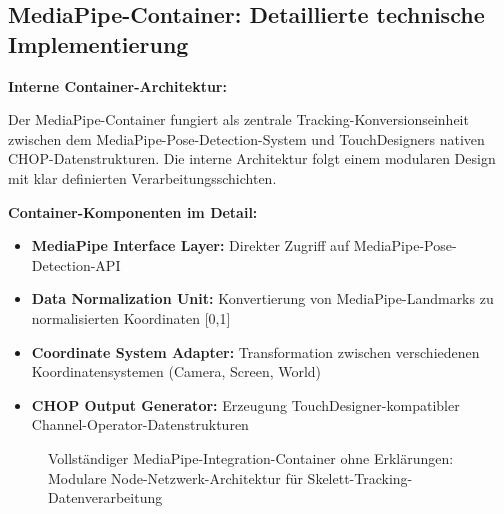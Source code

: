 \subsection{MediaPipe-Container: Detaillierte technische Implementierung}

\textbf{Interne Container-Architektur:}

\raggedright Der MediaPipe-Container fungiert als zentrale Tracking-Konversionseinheit zwischen dem MediaPipe-Pose-Detection-System und TouchDesigners nativen CHOP-Datenstrukturen. Die interne Architektur folgt einem modularen Design mit klar definierten Verarbeitungsschichten.

\textbf{Container-Komponenten im Detail:}
\begin{itemize}
    \item \textbf{MediaPipe Interface Layer:} Direkter Zugriff auf MediaPipe-Pose-Detection-API
    \item \textbf{Data Normalization Unit:} Konvertierung von MediaPipe-Landmarks zu normalisierten Koordinaten [0,1]
    \item \textbf{Coordinate System Adapter:} Transformation zwischen verschiedenen Koordinatensystemen (Camera, Screen, World)
    \item \textbf{CHOP Output Generator:} Erzeugung TouchDesigner-kompatibler Channel-Operator-Datenstrukturen
\end{itemize}

\begin{figure}[htbp]
    \centering
    \caption{Vollständiger MediaPipe-Integration-Container ohne Erklärungen: Modulare Node-Netzwerk-Architektur für Skelett-Tracking-Datenverarbeitung}
    \label{fig:mediapipe_container_komplett}
\end{figure}

